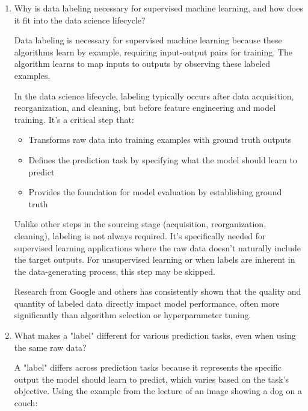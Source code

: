 \documentclass[12pt]{article}
\begin{document}
\begin{enumerate}
    \item Why is data labeling necessary for supervised machine learning, and how does it fit into the data science lifecycle?
    
    \begin{tcolorbox}[colback=blue!5!white,colframe=blue!75!black,title={Solution}]
    Data labeling is necessary for supervised machine learning because these algorithms learn by example, requiring input-output pairs for training. The algorithm learns to map inputs to outputs by observing these labeled examples.
    
    In the data science lifecycle, labeling typically occurs after data acquisition, reorganization, and cleaning, but before feature engineering and model training. It's a critical step that:
    
    \begin{itemize}
        \item Transforms raw data into training examples with ground truth outputs
        \item Defines the prediction task by specifying what the model should learn to predict
        \item Provides the foundation for model evaluation by establishing ground truth
    \end{itemize}
    
    Unlike other steps in the sourcing stage (acquisition, reorganization, cleaning), labeling is not always required. It's specifically needed for supervised learning applications where the raw data doesn't naturally include the target outputs. For unsupervised learning or when labels are inherent in the data-generating process, this step may be skipped.
    
    Research from Google and others has consistently shown that the quality and quantity of labeled data directly impact model performance, often more significantly than algorithm selection or hyperparameter tuning.
    \end{tcolorbox}
    
    \item What makes a "label" different for various prediction tasks, even when using the same raw data?
    
    \begin{tcolorbox}[colback=blue!5!white,colframe=blue!75!black,title={Solution}]
    A "label" differs across prediction tasks because it represents the specific output the model should learn to predict, which varies based on the task's objective. Using the example from the lecture of an image showing a dog on a couch:
    

\end{tcolorbox}
\end{enumerate}
\end{document}
